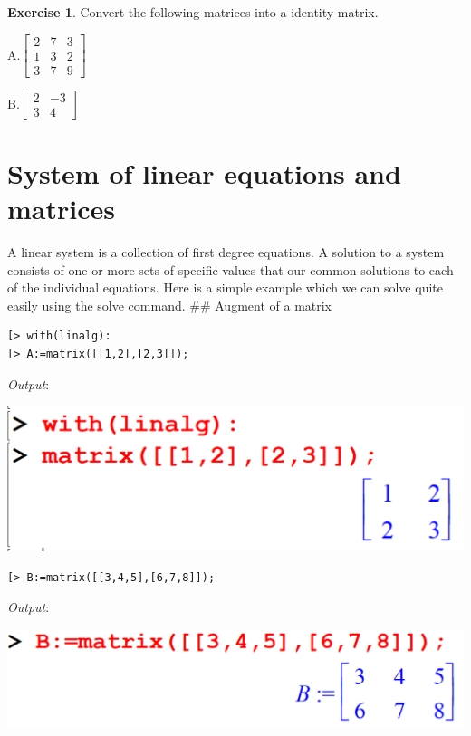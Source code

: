 \documentclass[
]{book}
\theoremstyle{definition}
\theoremstyle{definition}
\theoremstyle{definition}
\newtheorem{exercise}{Exercise}[chapter]
\theoremstyle{definition}
\theoremstyle{remark}
\begin{document}
\begin{exercise}
\protect\hypertarget{exr:unnamed-chunk-6}{}\label{exr:unnamed-chunk-6}Convert the following matrices into a identity matrix.

A.\(\begin{bmatrix} 2 & 7 & 3 \\ 1 & 3 & 2 \\  3 & 7 & 9\end{bmatrix}\)

B.\(\begin{bmatrix} 2 & -3 \\  3 & 4 \end{bmatrix}\)
\end{exercise}

\chapter{System of linear equations and matrices}\label{system-of-linear-equations-and-matrices}

A linear system is a collection of first degree equations. A solution to a system consists of one or more sets of specific values that our common solutions to each of the individual equations. Here is a simple example which we can solve quite easily using the solve command.
\#\# Augment of a matrix

\begin{verbatim}
[> with(linalg):
[> A:=matrix([[1,2],[2,3]]);
\end{verbatim}

\emph{Output}:

\includegraphics{figures/Lesson 5/fig1.png}

\begin{verbatim}
[> B:=matrix([[3,4,5],[6,7,8]]);
\end{verbatim}

\emph{Output}:

\includegraphics{figures/Lesson 5/fig2.png}
\end{document}
